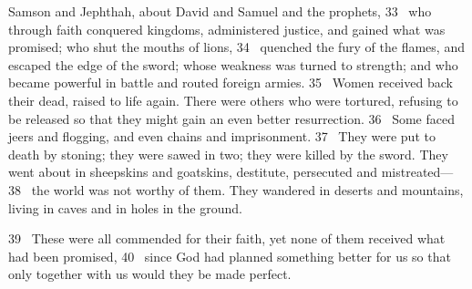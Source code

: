Samson
and Jephthah,
about David
and Samuel
and the prophets,
33 
who through faith conquered kingdoms,
administered justice, and gained what was promised; who shut the mouths of lions,
34 
quenched the fury of the flames,
and escaped the edge of the sword;
whose weakness was turned to strength;
and who became powerful in battle and routed foreign armies.
35 
Women received back their dead, raised to life again.
There were others who were tortured, refusing to be released so that they might gain an even better resurrection.
36 
Some faced jeers and flogging,
and even chains and imprisonment.
37 
They were put to death by stoning;
they were sawed in two; they were killed by the sword.
They went about in sheepskins and goatskins,
destitute, persecuted and mistreated—
38 
the world was not worthy of them. They wandered in deserts and mountains, living in caves
and in holes in the ground.
\par
39 
These were all commended
for their faith, yet none of them received what had been promised,
40 
since God had planned something better for us so that only together with us
would they be made perfect.



\bye

